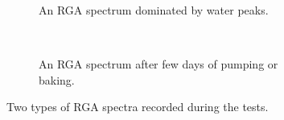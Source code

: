 \begin{figure}[!ht]
  \begin{subfigure}[t]{0.5\textwidth}
    
    \caption{An RGA spectrum dominated by water peaks.}
    \label{chap4:vacuum_rga_b}
  \end{subfigure}
  ~
  \begin{subfigure}[t]{0.5\textwidth}
    
    \caption{An RGA spectrum after few days of pumping or baking.}
    \label{chap4:vacuum_rga_a}
  \end{subfigure}
  \caption[Two types of RGA spectra recorded during the tests]{Two types of RGA spectra recorded during the tests.}
  \label{chap4:vacuum_rga}
\end{figure}

